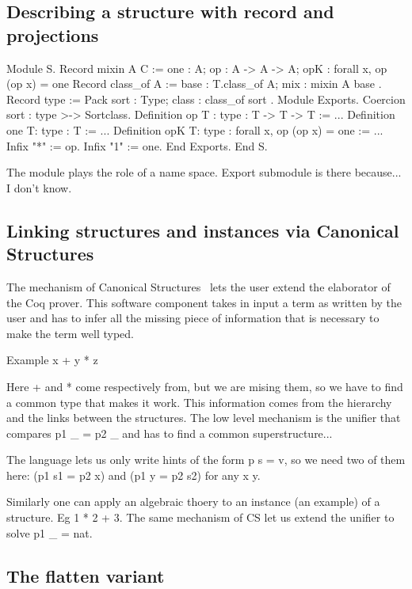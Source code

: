 \documentclass[a4paper,UKenglish,cleveref, autoref]{lipics-v2019}
\theoremstyle{implem}
\theoremstyle{implem}
\theoremstyle{axiom}
\theoremstyle{abscommand}
\theoremstyle{command}
\begin{document}
\subsection{Describing a structure with record and projections}

\begin{coqcode}
Module S.
  Record mixin A C := {
    one : A;
    op : A -> A -> A;
    opK : forall x, op (op x) = one
  }
  Record class_of A := {
    base : T.class_of A;
    mix  : mixin A base
  }.
  Record type := Pack {
    sort : Type;
    class : class_of sort
  }.
  Module Exports.
    Coercion sort : type >-> Sortclass.
    Definition op {T : type} : T -> T -> T := ...
    Definition one {T:  type} : T := ...
    Definition opK {T:  type} : forall x, op (op x) = one := ...
    Infix "*" := op.
    Infix "1" := one.
  End Exports.
End S.
\end{coqcode}

The module plays the role of a name space.
Export submodule is there because... I don't know.

\subsection{Linking structures and instances via Canonical Structures}

The mechanism of Canonical Structures~\cite{DBLP:conf/itp/MahboubiT13}
lets the user extend the elaborator of the Coq prover. This software component
takes in input a term as written by the user and has to infer all the missing
piece of information that is necessary to make the term well typed.

Example x + y * z

Here + and * come respectively from, but we are mising them, so we have
to find a common type that makes it work. This information comes from
the hierarchy and the links between the structures. The low level mechanism
is the unifier that compares p1 \_ = p2 \_ and has to find a common
superstructure...

The language lets us only write hints of the form p s = v, so we need two
of them here: (p1 s1 = p2 x) and (p1 y = p2 s2) for any x y.

Similarly one can apply an algebraic thoery to an instance (an example)
of a structure. Eg 1 * 2 + 3. The same mechanism of CS let us
extend the unifier to solve p1 \_ = nat.

\subsection{The flatten variant}
\end{document}
